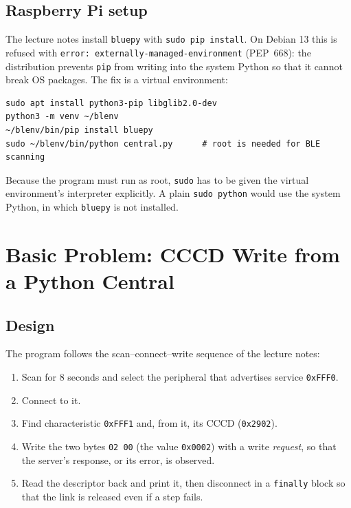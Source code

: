 \documentclass[11pt,a4paper]{article}
\begin{document}
\subsection{Raspberry Pi setup}

The lecture notes install \texttt{bluepy} with \texttt{sudo pip install}. On
Debian 13 this is refused with \texttt{error: externally-managed-environment}
(PEP~668): the distribution prevents \texttt{pip} from writing into the system
Python so that it cannot break OS packages. The fix is a virtual environment:

\begin{lstlisting}[style=shellstyle,caption={Installing bluepy on Debian 13.}]
sudo apt install python3-pip libglib2.0-dev
python3 -m venv ~/blenv
~/blenv/bin/pip install bluepy
sudo ~/blenv/bin/python central.py      # root is needed for BLE scanning
\end{lstlisting}

Because the program must run as root, \texttt{sudo} has to be given the
virtual environment's interpreter explicitly. A plain \texttt{sudo python}
would use the system Python, in which \texttt{bluepy} is not installed.

\section{Basic Problem: CCCD Write from a Python Central}
\label{sec:basic}

\subsection{Design}

The program follows the scan--connect--write sequence of the lecture notes:

\begin{enumerate}
  \item Scan for 8 seconds and select the peripheral that advertises service
        \texttt{0xFFF0}.
  \item Connect to it.
  \item Find characteristic \texttt{0xFFF1} and, from it, its CCCD
        (\texttt{0x2902}).
  \item Write the two bytes \texttt{02 00} (the value \texttt{0x0002}) with a
        write \emph{request}, so that the server's response, or its error, is
        observed.
  \item Read the descriptor back and print it, then disconnect in a
        \texttt{finally} block so that the link is released even if a step
        fails.
\end{enumerate}
\end{document}
